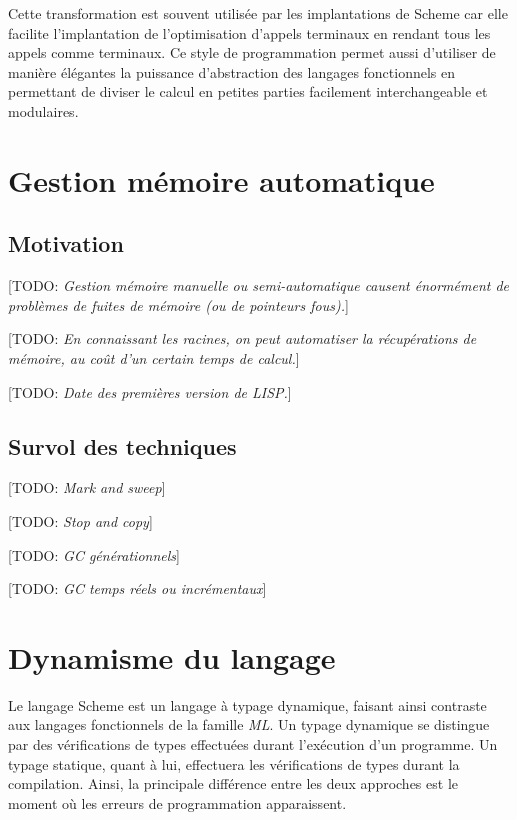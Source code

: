 \documentclass[12pt,oneside,letterpaper,francais]{book}
\newcommand{\todo}[1]{[TODO: {\it #1}]}
\begin{document}
Cette transformation est souvent utilisée par les implantations de
Scheme car elle facilite l'implantation de l'optimisation d'appels
terminaux en rendant tous les appels comme terminaux. Ce style de
programmation permet aussi d'utiliser de manière élégantes la
puissance d'abstraction des langages fonctionnels en permettant de
diviser le calcul en petites parties facilement interchangeable et
modulaires.





\section{Gestion mémoire automatique}
\subsection{Motivation}
\todo{Gestion mémoire manuelle ou semi-automatique causent énormément
  de problèmes de fuites de mémoire (ou de pointeurs fous).}

\todo{En connaissant les racines, on peut automatiser la récupérations
  de mémoire, au coût d'un certain temps de calcul.}

\todo{Date des premières version de LISP.}



\subsection{Survol des techniques}
\todo{Mark and sweep}

\todo{Stop and copy}

\todo{GC générationnels}

\todo{GC temps réels ou incrémentaux}



\section{Dynamisme du langage}

Le langage Scheme est un langage à typage dynamique, faisant ainsi
contraste aux langages fonctionnels de la famille \textit{ML}. Un
typage dynamique se distingue par des vérifications de types
effectuées durant l'exécution d'un programme. Un typage statique,
quant à lui, effectuera les vérifications de types durant la
compilation. Ainsi, la principale différence entre les deux approches
est le moment où les erreurs de programmation apparaissent. 
\end{document}
